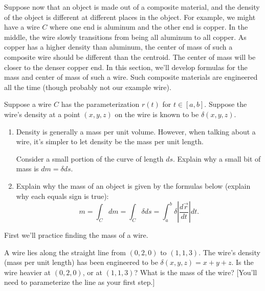 Suppose now that an object is made out of a composite material, and the density of the object is different at different places in the object. For example, we might have a wire $C$ where one end is aluminum and the other end is copper. In the middle, the wire slowly transitions from being all aluminum to all copper. As copper has a higher density than aluminum, the center of mass of such a composite wire should be different than the centroid. The center of mass will be closer to the denser copper end. In this section, we'll develop formulas for the mass and center of mass of such a wire. Such composite materials are engineered all the time (though probably not our example wire).  

\begin{problem}[Mass]\label{mass of curve}%
%
 Suppose a wire $C$ has the parameterization $r(t)$ for $t\in[a,b]$.  Suppose the wire's density at a point $(x,y,z)$ on the wire is known to be $\delta(x,y,z)$. 
 \begin{enumerate}
  \item Density is generally a mass per unit volume.  However, when talking about a wire, it's simpler to let density be the mass per unit length.  

  Consider a small portion of the curve of length $ds$.  Explain why a small bit of mass is $dm=\delta ds$.
  \item Explain why the mass of an object is given by the formulas below (explain why each equals sign is true):
$$m=\int_C dm = \int_C \delta ds = \int_a^b \delta \left|\frac{d\vec r}{dt}\right|dt.$$
 \end{enumerate}
\end{problem}

First we'll practice finding the mass of a wire.

\begin{problem}%
 A wire lies along the straight line from $(0,2,0)$ to $(1,1,3)$.  The wire's density (mass per unit length) has been engineered to be $\delta(x,y,z)=x+y+z$. Is the wire heavier at $(0,2,0)$, or at $(1,1,3)$? What is the mass of the wire?  [You'll need to parameterize the line as your first step.]
\end{problem}

